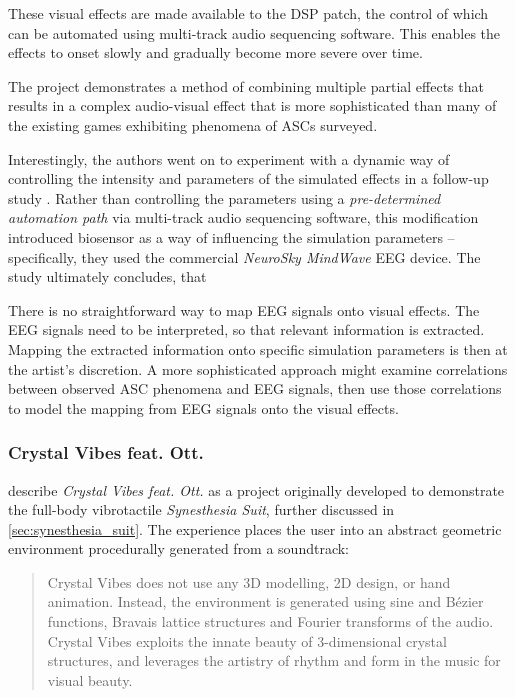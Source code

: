 These visual effects are made available to the \ac{DSP} patch, the control of which can be automated using multi-track audio sequencing software. This enables the effects to onset slowly and gradually become more severe over time.

The project demonstrates a method of combining multiple partial effects that results in a complex audio-visual effect that is more sophisticated than many of the existing games exhibiting phenomena of \acp{ASC} surveyed.

Interestingly, the authors went on to experiment with a dynamic way of controlling the intensity and parameters of the simulated effects in a follow-up study \autocite{weinel2015quake}. Rather than controlling the parameters using a \textit{pre-determined automation path} via multi-track audio sequencing software, this modification introduced biosensor as a way of influencing the simulation parameters -- specifically, they used the commercial \textit{NeuroSky MindWave} \ac{EEG} device. The study ultimately concludes, that 

There is no straightforward way to map \ac{EEG} signals onto visual effects. The \ac{EEG} signals need to be interpreted, so that relevant information is extracted. Mapping the extracted information onto specific simulation parameters is then at the artist's discretion. A more sophisticated approach might examine correlations between observed \ac{ASC} phenomena and \ac{EEG} signals, then use those correlations to model the mapping from \ac{EEG} signals onto the visual effects.

\subsubsection{Crystal Vibes feat. Ott.}
\textcite{outram2017crystal} describe \textit{Crystal Vibes feat. Ott.} as a project originally developed to demonstrate the full-body vibrotactile \textit{Synesthesia Suit}, further discussed in \ref{sec:synesthesia_suit}. The experience places the user into an abstract geometric environment procedurally generated from a soundtrack:

\begin{quote}
    Crystal Vibes does not use any 3D modelling, 2D design, or hand animation. Instead, the environment is generated using sine and Bézier functions, Bravais lattice structures and Fourier transforms of the audio. Crystal Vibes exploits the innate beauty of 3-dimensional crystal structures, and leverages the artistry of rhythm and form in the music for visual beauty.
\end{quote}


